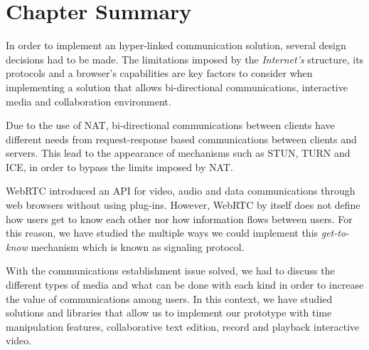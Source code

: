 \section{Chapter Summary}
\label{related:summary}

In order to implement an hyper-linked communication solution, several design decisions had to be made. The limitations imposed by the \emph{Internet's} structure, its protocols and a browser's capabilities are key factors to consider when implementing a solution that allows bi-directional communications, interactive media and collaboration environment.

Due to the use of \ac{NAT}, bi-directional communications between clients have different needs from request-response based communications between clients and servers.
This lead to the appearance of mechanisms such as \ac{STUN}, \ac{TURN} and \ac{ICE}, in order to bypass the limits imposed by \ac{NAT}.

\ac{WebRTC} introduced an \ac{API} for video, audio and data communications through web browsers without using plug-ins.
However, \ac{WebRTC} by itself does not define how users get to know each other nor how information flows between users. For this reason, we have studied the multiple ways we could implement this \emph{get-to-know} mechanism which is known as signaling protocol.

With the communications establishment issue solved, we had to discuss the different types of media and what can be done with each kind in order to increase the value of communications among users. In this context, we have studied solutions and libraries that allow us to implement our prototype with time manipulation features, collaborative text edition, record and playback interactive video. 
